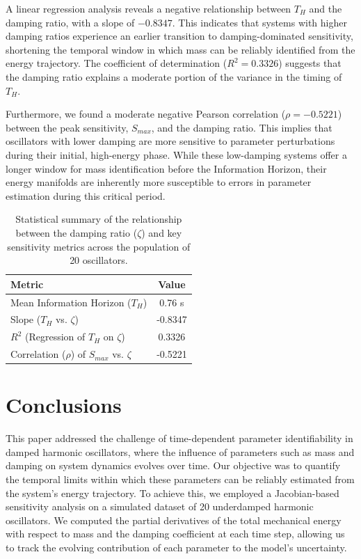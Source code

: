 \documentclass[]{article}
\begin{document}
A linear regression analysis reveals a negative relationship between $T_H$ and the damping ratio, with a slope of $-0.8347$. This indicates that systems with higher damping ratios experience an earlier transition to damping-dominated sensitivity, shortening the temporal window in which mass can be reliably identified from the energy trajectory. The coefficient of determination ($R^2 = 0.3326$) suggests that the damping ratio explains a moderate portion of the variance in the timing of $T_H$.

Furthermore, we found a moderate negative Pearson correlation ($\rho = -0.5221$) between the peak sensitivity, $S_{max}$, and the damping ratio. This implies that oscillators with lower damping are more sensitive to parameter perturbations during their initial, high-energy phase. While these low-damping systems offer a longer window for mass identification before the Information Horizon, their energy manifolds are inherently more susceptible to errors in parameter estimation during this critical period.

\begin{table}[h!]
\centering
\caption{Statistical summary of the relationship between the damping ratio ($\zeta$) and key sensitivity metrics across the population of 20 oscillators.}
\label{tab:stats_summary}
\begin{tabular}{lc}
\hline
\hline
Metric & Value \\
\hline
Mean Information Horizon ($T_H$) & 0.76 s \\
Slope ($T_H$ vs. $\zeta$) & -0.8347 \\
$R^2$ (Regression of $T_H$ on $\zeta$) & 0.3326 \\
Correlation ($\rho$) of $S_{max}$ vs. $\zeta$ & -0.5221 \\
\hline
\end{tabular}
\end{table}

\section{Conclusions}
\label{sec:conclusions}


This paper addressed the challenge of time-dependent parameter identifiability in damped harmonic oscillators, where the influence of parameters such as mass and damping on system dynamics evolves over time. Our objective was to quantify the temporal limits within which these parameters can be reliably estimated from the system's energy trajectory. To achieve this, we employed a Jacobian-based sensitivity analysis on a simulated dataset of 20 underdamped harmonic oscillators. We computed the partial derivatives of the total mechanical energy with respect to mass and the damping coefficient at each time step, allowing us to track the evolving contribution of each parameter to the model's uncertainty.
\end{document}
